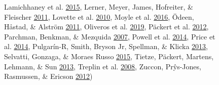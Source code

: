 \begin{figure}[!h]
{Lamichhaney et al. \protect\hyperlink{ref-lamichhaney2015evolution}{2015},
Lerner, Meyer, James, Hofreiter, \& Fleischer \protect\hyperlink{ref-lerner2011multilocus}{2011},
Lovette et al. \protect\hyperlink{ref-lovette2010comprehensive}{2010},
Moyle et al. \protect\hyperlink{ref-moyle2016tectonic}{2016},
Ödeen, Håstad, \& Alström \protect\hyperlink{ref-odeen2011evolution}{2011},
Oliveros et al. \protect\hyperlink{ref-oliveros2019earth}{2019},
Päckert et al. \protect\hyperlink{ref-packert2012horizontal}{2012},
Parchman, Benkman, \& Mezquida \protect\hyperlink{ref-parchman2007coevolution}{2007},
Powell et al. \protect\hyperlink{ref-powell2014comprehensive}{2014},
Price et al. \protect\hyperlink{ref-price2014niche}{2014},
Pulgarín-R, Smith, Bryson Jr, Spellman, \& Klicka \protect\hyperlink{ref-pulgarin2013multilocus}{2013},
Selvatti, Gonzaga, \& Moraes Russo \protect\hyperlink{ref-selvatti2015paleogene}{2015},
Tietze, Päckert, Martens, Lehmann, \& Sun \protect\hyperlink{ref-tietze2013complete}{2013},
Treplin et al. \protect\hyperlink{ref-treplin2008molecular}{2008},
Zuccon, Prŷs-Jones, Rasmussen, \& Ericson \protect\hyperlink{ref-zuccon2012phylogenetic}{2012})
}
\label{fig:fringillidae-topologies}
\end{figure}




